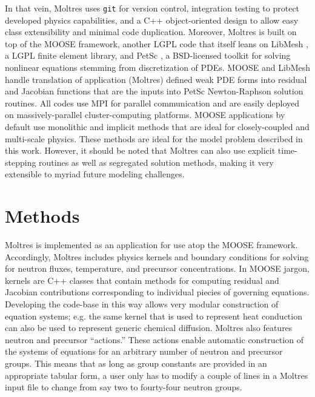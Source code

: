 \documentclass{article}
\let\Oldsection\section
\renewcommand{\section}{\FloatBarrier\Oldsection}
\begin{document}
In that vein, Moltres uses
\texttt{git} for version control, integration testing to protect
developed physics capabilities, and a C++ object-oriented design to allow easy
class extensibility and minimal code duplication. Moreover, Moltres is built on
top of the \gls{MOOSE} framework, \cite{gaston_physics-based_2015} another \gls{LGPL}
code that itself leans on LibMesh \cite{kirk2006libmesh}, a \gls{LGPL} finite element
library, and PetSc \cite{petsc-user-ref}, a \gls{BSD}-licensed toolkit for solving nonlinear
equations stemming from discretization of PDEs. \gls{MOOSE} and LibMesh handle
translation of application (Moltres) defined weak PDE forms into residual and
Jacobian functions that are the inputs into PetSc Newton-Raphson solution
routines. All codes use MPI for parallel communication and are easily deployed
on massively-parallel cluster-computing platforms. \gls{MOOSE} applications by default
use monolithic and implicit methods that are ideal for closely-coupled and
multi-scale physics. These methods are ideal for the model problem described in
this work. However, it should be noted that Moltres can also use explicit
time-stepping routines as well as segregated solution methods, making it very 
extensible to myriad future modeling challenges.

\section{Methods}

Moltres \cite{lindsay_arfc/moltres_nodate} is implemented as an application for 
use atop the \gls{MOOSE} \cite{gaston_physics-based_2015} framework. 
Accordingly, Moltres includes physics kernels and boundary conditions for
solving for neutron fluxes, temperature, and precursor concentrations. In \gls{MOOSE}
jargon, kernels are C++ classes that contain methods for computing residual and
Jacobian contributions corresponding to individual piecies of governing
equations. Developing the code-base in this way allows very modular construction
of equation systems; e.g. the same kernel that is used to represent heat
conduction can also be used to represent generic chemical diffusion. Moltres
also features neutron and precursor ``actions.'' These actions enable automatic
construction of the systems of equations for an arbitrary number of neutron and
precursor groups. This means that as long as group constants are provided in an appropriate
tabular form, a user only has to modify a couple of lines in a Moltres input
file to change from say two to fourty-four neutron groups.
\end{document}
